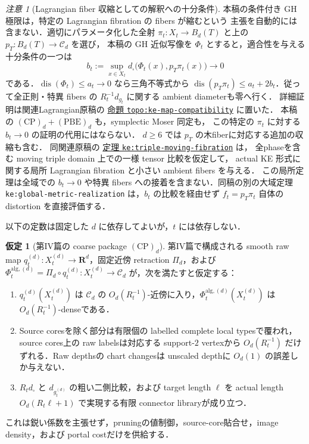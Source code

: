 \documentclass[a4paper,11pt]{ltjsarticle}
\numberwithin{equation}{section}
\theoremstyle{plain}
\theoremstyle{definition}
\newtheorem{hypothesis}[hypothesis]{仮定}
\theoremstyle{remark}
\newtheorem{remark}[remark]{注意}
\newcommand{\RR}{\mathbf R}
\newcommand{\Cd}{\mathcal C_d}
\begin{document}
\begin{remark}[Lagrangian fiber 収縮としての解釈への十分条件]
\label{rem:ke-lagrangian-compatibility}
本稿の条件付き GH 極限は，特定の Lagrangian fibration の fibers が縮むという
主張を自動的には含まない．適切にパラメータ化した全射
$\pi_t:X_t\to B_d(T)$ と上の $p_T:B_d(T)\to\Cd$ を選び，
本稿の GH 近似写像を $\Phi_t$ とすると，適合性を与える十分条件の一つは
\[
 b_t:=\sup_{x\in X_t}d_\square\bigl(\Phi_t(x),p_T\pi_t(x)\bigr)\longrightarrow0
\]
である．$\operatorname{dis}(\Phi_t)\le a_t\to0$ なら三角不等式から
$\operatorname{dis}(p_T\pi_t)\le a_t+2b_t$．従って全正則・特異 fibers の
$R_t^{-1}d_{g_t}$ に関する ambient diameterも零へ行く．
詳細証明は関連Lagrangian原稿の
\href{https://github.com/uedakazushi/surface-lagrangian-torus-fibration/blob/main/papers/sections/paper/base_topology.tex}
{命題 \texttt{topo:ke-map-compatibility}} に置いた．
本稿の $\mathrm{(CP)}_d+\mathrm{(PBE)}_d$ も，symplectic Moser 同定も，
この特定の $\pi_t$ に対する $b_t\to0$ の証明の代用にはならない．
$d\ge6$ では $p_T$ の木fiberに対応する追加の収縮も含む．
同関連原稿の
\href{https://github.com/uedakazushi/surface-lagrangian-torus-fibration/blob/main/papers/sections/paper/ke_fiber_compatibility.tex}
{定理 \texttt{ke:triple-moving-fibration}} は，
全phaseを含む moving triple domain 上での一様 tensor 比較を仮定して，
actual KE 形式に関する局所 Lagrangian fibration と小さい ambient fibers を与える．
この局所定理は全域での $b_t\to0$ や特異 fibers への接着を含まない．同稿の別の大域定理 \texttt{ke:global-metric-realization} は，$b_t$ の比較を経由せず $f_t=p_T\pi_t$ 自体の distortion を直接評価する．
\end{remark}

以下の定数は固定した $d$ に依存してよいが，$t$ には依存しない．

\begin{hypothesis}[第IV篇の coarse package $\mathrm{(CP)}_d$]\label{hyp:CPd}
第IV篇で構成される smooth raw map $q_t^{(d)}:X_t^{(d)}\to\RR^d$，固定近傍 retraction $\Pi_d$，および $\Phi_t^{\mathrm{alg},(d)}=\Pi_d\circ q_t^{(d)}:X_t^{(d)}\to\Cd$ が，次を満たすと仮定する：
\begin{enumerate}[label=\textup{(CP\arabic*)}]
\item $q_t^{(d)}(X_t^{(d)})$ は $\Cd$ の $O_d(R_t^{-1})$-近傍に入り，$\Phi_t^{\mathrm{alg},(d)}(X_t^{(d)})$ は $O_d(R_t^{-1})$-denseである．
\item Source coresを除く部分は有限個の labelled complete local typesで覆われ，source cores上の raw labelsは対応する support-$2$ vertexから $O_d(R_t^{-1})$ だけずれる．Raw depthsの chart changesは unscaled depthに $O_d(1)$ の誤差しか与えない．
\item $R_t d_\square$ と $d_{g_t^{(d)}}$ の粗い二側比較，および target length $\ell$ を actual length $O_d(R_t\ell+1)$ で実現する有限 connector libraryが成り立つ．
\end{enumerate}
これは鋭い係数を主張せず，pruningの値制御，source-core貼合せ，image density，および portal costだけを供給する．
\end{hypothesis}
\end{document}
